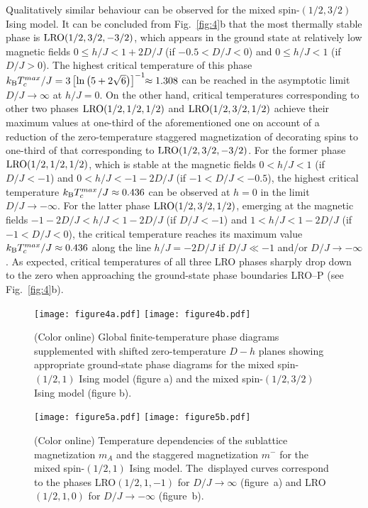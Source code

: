 \documentclass[final,5p,times,sort&compress]{elsarticle}
\begin{document}
Qualitatively similar behaviour can be observed for the \linebreak mixed spin-$(1/2,3/2)$ Ising model. It can be concluded from Fig.~\ref{fig:4}b that the most thermally stable phase is \linebreak ${\rm LRO}(1/2, 3/2,-3/2)$, which appears in the ground state at relatively low magnetic fields $0 \leq h/J < 1 + 2D/J$ (if $-0.5<D/J<0$) and $0\leq h/J < 1$ (if $D/J>0$). The highest critical temperature of this phase $k_{\rm B}T_c^{max}/J = 3\left[\ln\left(5+2\sqrt{6}\right)\right]^{-1}\!\!\approx 1.308$ can be reached in the asymptotic limit $D/J\to\infty$ at $h/J=0$. On the other hand, critical temperatures corresponding to other two phases ${\rm LRO}(1/2,1/2,1/2)$ and ${\rm LRO}(1/2,3/2,1/2)$ achieve their maximum values at one-third of the aforementioned one on account of a reduction of the zero-temperature staggered magnetization of decorating spins to one-third of that corresponding to ${\rm LRO}(1/2, 3/2,-3/2)$. For the former phase ${\rm LRO}(1/2,1/2,1/2)$, which is stable at the magnetic fields $0 < h/J < 1$ (if $D/J<-1$) and $0 < h/J < -1 - 2D/J$ (if $-1<D/J<-0.5$), the highest critical temperature $k_{\rm B}T_c^{max}/J \approx 0.436$ can be observed at $h=0$ in the limit $D/J\to-\infty$. For the latter phase ${\rm LRO}(1/2,3/2,1/2)$, emerging at the magnetic fields $-1-2D/J < h/J < 1-2D/J$ (if $D/J<-1$) and $1 < h/J < 1 - 2D/J$ (if $-1<D/J<0$), the critical temperature reaches its maximum value $k_{\rm B}T_c^{max}/J \approx 0.436$ along the line $h/J=-2D/J$ if $D/J\ll-1$ and/or $D/J\to-\infty$. As expected, critical temperatures of all three LRO phases sharply drop down to the zero when approaching the ground-state phase boundaries LRO--P (see Fig.~\ref{fig:4}b).
\begin{figure*}[t!]
\vspace{-1.0cm}
\centering
  \texttt{[image: figure4a.pdf]}
  \hspace{-0.25cm}
  \texttt{[image: figure4b.pdf]}
\vspace{-0.5cm}
\caption{(Color online) Global finite-temperature phase diagrams supplemented with shifted zero-temperature $D-h$ planes showing appropriate ground-state phase diagrams for the mixed spin-$(1/2,1)$ Ising model  (figure a) and the mixed spin-$(1/2,3/2)$ Ising model (figure b).
}
\label{fig:4}
\vspace{8mm}
\centering
  \texttt{[image: figure5a.pdf]}
    \hspace{-0.25cm}
  \texttt{[image: figure5b.pdf]}
\vspace{-0.25cm}
\caption{(Color online) Temperature dependencies of the sublattice magnetization $m_A$ and the staggered magnetization $m^{-}$ for the mixed spin-$(1/2,1)$ Ising model. The~displayed curves correspond to the phases LRO$(1/2,1,-1)$ for $D/J\to\infty$ (figure~a) and LRO$(1/2,1,0)$ for $D/J\to-\infty$ (figure~b).
}
\label{fig:5}
\end{figure*}
\end{document}
